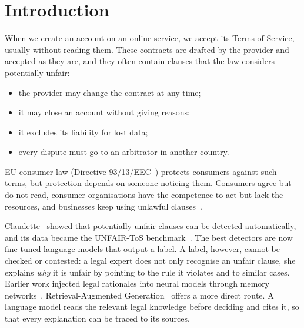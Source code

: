 \section{Introduction}
\label{sec:intro}

When we create an account on an online service, we accept its Terms of Service, usually without reading them. These contracts are drafted by the provider and accepted as they are, and they often contain clauses that the law considers potentially unfair:
\begin{itemize}
  \item the provider may change the contract at any time;
  \item it may close an account without giving reasons;
  \item it excludes its liability for lost data;
  \item every dispute must go to an arbitrator in another country.
\end{itemize}
EU consumer law (Directive 93/13/EEC~\citep{dir93}) protects consumers against such terms, but protection depends on someone noticing them. Consumers agree but do not read, consumer organisations have the competence to act but lack the resources, and businesses keep using unlawful clauses~\citep{slides_claudette}.

Claudette~\citep{lippi2019claudette} showed that potentially unfair clauses can be detected automatically, and its data became the UNFAIR-ToS benchmark~\citep{chalkidis2022lexglue}. The best detectors are now fine-tuned language models that output a label. A label, however, cannot be checked or contested: a legal expert does not only recognise an unfair clause, she explains \emph{why} it is unfair by pointing to the rule it violates and to similar cases. Earlier work injected legal rationales into neural models through memory networks~\citep{ruggeri2022memory}. Retrieval-Augmented Generation~\citep{lewis2020rag} offers a more direct route. A language model reads the relevant legal knowledge before deciding and cites it, so that every explanation can be traced to its sources.

